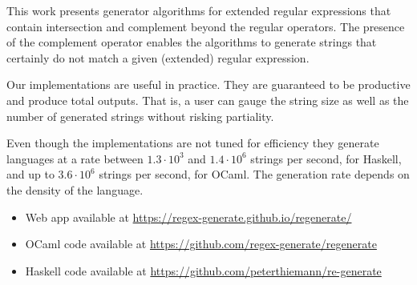 \documentclass{llncs}
\begin{document}
This work presents generator algorithms for extended regular expressions that
contain intersection and complement beyond the regular operators. The
presence of the complement operator enables the algorithms to generate
strings that certainly do not match a given (extended) regular
expression.

Our implementations are useful in practice. They are guaranteed to be
productive and produce total outputs. That is, a user can gauge the
string size as well as the number of generated strings without risking
partiality.

Even though the implementations
are not tuned for efficiency they generate
languages at a rate between $1.3\cdot10^3$ and $1.4\cdot10^6$ strings per
second, for Haskell, and up to $3.6\cdot10^6$ strings per second, for
OCaml. The generation rate depends on the density of the language.

\begin{itemize}
\item Web app available at \url{https://regex-generate.github.io/regenerate/}
\item OCaml code available at \url{https://github.com/regex-generate/regenerate}
\item Haskell code available at \url{https://github.com/peterthiemann/re-generate}
\end{itemize}

\end{document}
